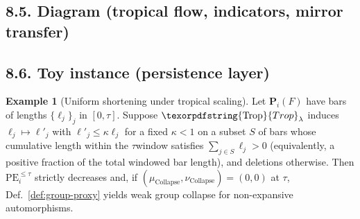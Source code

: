 \documentclass[11pt]{article}
\numberwithin{equation}{section}
\theoremstyle{plain}
\theoremstyle{definition}
\theoremstyle{remark}
\DeclareMathOperator{\Ext}{Ext}
\DeclareRobustCommand{\hyp}{\nobreakdash-}
\newcommand{\Rfun}{\mathcal{R}}
\theoremstyle{plain}
\theoremstyle{definition}
\numberwithin{equation}{section}
\theoremstyle{definition}
\newtheorem{example}[theorem]{Example}
\DeclareRobustCommand{\Ttau}{\texorpdfstring{\ensuremath{\mathbf{T}_{\tau}}}{T\_\tau}}
\DeclareRobustCommand{\Ctau}{\texorpdfstring{\ensuremath{C_{\tau}}}{C\_\tau}}
\DeclareRobustCommand{\LC}{\texorpdfstring{\ensuremath{\mathrm{(LC)}}}{(LC)}}
\DeclareRobustCommand{\Trop}{\texorpdfstring{\ensuremath{\operatorname{Trop}}}{Trop}}
\DeclareRobustCommand{\Mirror}{\texorpdfstring{\ensuremath{\operatorname{Mirror}}}{Mirror}}
\numberwithin{equation}{section}
\theoremstyle{plain}
\theoremstyle{definition}
\theoremstyle{remark}
\providecommand{\Cfun}[1]{\mathsf{C}_{#1}}
\providecommand{\Tfun}[1]{\mathbf{T}_{#1}}
\providecommand{\Ctau}{\Cfun{\tau}}
\providecommand{\Ttau}{\Tfun{\tau}}
\providecommand{\n}{\unskip\space}
\begin{document}
\subsection*{8.5. Diagram (tropical flow, indicators, mirror transfer)}
\begin{center}
\end{center}

\subsection*{8.6. Toy instance (persistence layer)}
\begin{example}[Uniform shortening under tropical scaling]\label{ex:trop}
Let \(\mathbf{P}_i(F)\) have bars of lengths \(\{\ell_j\}_j\) in \([0,\tau]\).
Suppose \(\Trop_\lambda\) induces \(\ell_j\mapsto \ell'_j\) with \(\ell'_j\le \kappa\ell_j\) for a fixed \(\kappa<1\) on a subset \(S\) of bars whose cumulative length within the \(\tau\)\nobreakdash window satisfies \(\sum_{j\in S}\ell_j>0\)
(equivalently, a positive fraction of the total windowed bar length), and deletions otherwise.
Then \(\mathrm{PE}_i^{\le\tau}\) strictly decreases and, if \((\mu_{\mathrm{Collapse}},\nu_{\mathrm{Collapse}})=(0,0)\) at \(\tau\), Def.~\ref{def:group-proxy} yields weak group collapse for non\hyp expansive automorphisms.
\end{example}
\end{document}

